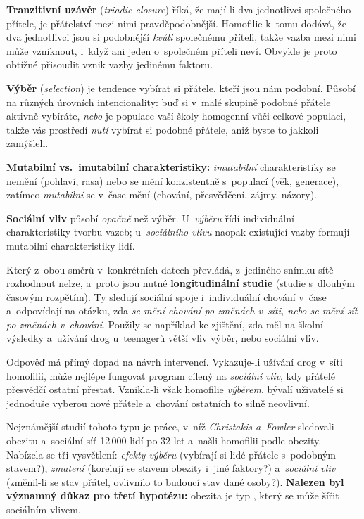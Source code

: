 \documentclass[11pt,a4paper]{article}
\theoremstyle{definition}
\begin{document}
\begin{defbox}
\textbf{Tranzitivní uzávěr} (\emph{triadic closure}) říká, že mají-li dva jednotlivci
společného přítele, je přátelství mezi nimi pravděpodobnější. Homofilie k~tomu dodává, že dva
jednotlivci jsou si podobnější \emph{kvůli} společnému příteli, takže vazba mezi nimi může
vzniknout, i~když ani jeden o~společném příteli neví. Obvykle je proto obtížné přisoudit vznik
vazby jedinému faktoru.

\textbf{Výběr} (\emph{selection}) je tendence vybírat si přátele, kteří jsou nám podobní.
Působí na různých úrovních intencionality: buď si v~malé skupině podobné přátele aktivně
vybíráte, \emph{nebo} je populace vaší školy homogenní vůči celkové populaci, takže vás
prostředí \emph{nutí} vybírat si podobné přátele, aniž byste to jakkoli zamýšleli.

\textbf{Mutabilní vs.\ imutabilní charakteristiky:} \emph{imutabilní} charakteristiky se
nemění (pohlaví, rasa) nebo se mění konzistentně s~populací (věk, generace), zatímco
\emph{mutabilní} se v~čase mění (chování, přesvědčení, zájmy, názory).

\textbf{Sociální vliv} působí \emph{opačně} než výběr. U~\emph{výběru} řídí individuální
charakteristiky tvorbu vazeb; u~\emph{sociálního vlivu} naopak existující vazby formují
mutabilní charakteristiky lidí.
\end{defbox}

Který z~obou směrů v~konkrétních datech převládá, z~jediného snímku sítě rozhodnout nelze,
a~proto jsou nutné \textbf{longitudinální studie} (studie s~dlouhým časovým rozpětím). Ty
sledují sociální spoje i~individuální chování v~čase a~odpovídají na otázku, zda \emph{se mění
chování po změnách v~síti, nebo se mění síť po změnách v~chování}. Použily se například ke
zjištění, zda měl na školní výsledky a~užívání drog u~teenagerů větší vliv výběr, nebo sociální
vliv.

Odpověď má přímý dopad na návrh intervencí. Vykazuje-li užívání drog v~síti homofilii, může
nejlépe fungovat program cílený na \emph{sociální vliv}, kdy přátelé přesvědčí ostatní přestat.
Vznikla-li však homofilie \emph{výběrem}, bývalí uživatelé si jednoduše vyberou nové přátele
a~chování ostatních to silně neovlivní.

Nejznámější studií tohoto typu je práce, v~níž \emph{Christakis a~Fowler} sledovali obezitu
a~sociální síť 12\,000 lidí po 32 let a~našli homofilii podle obezity. Nabízela se tři
vysvětlení: \emph{efekty výběru} (vybírají si lidé přátele s~podobným stavem?), \emph{zmatení}
(korelují se stavem obezity i~jiné faktory?) a~\emph{sociální vliv} (změnil-li se stav přátel,
ovlivnilo to budoucí stav dané osoby?). \textbf{Nalezen byl významný důkaz pro třetí hypotézu:}
obezita je typ , který se může šířit sociálním vlivem.
\end{document}
